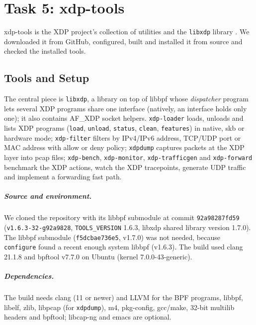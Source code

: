 \chapter{Task 5: xdp-tools}\label{ch:task5}

xdp-tools is the XDP project's collection of utilities and the \texttt{libxdp} library \autocite{xdptools_github}. We downloaded it from GitHub, configured, built and installed it from source and checked the installed tools.

\section{Tools and Setup}\label{sec:t5-setup}

The central piece is \texttt{libxdp}, a library on top of libbpf whose \emph{dispatcher} program lets several XDP programs share one interface (natively, an interface holds only one); it also contains AF\_XDP socket helpers. \texttt{xdp-loader} loads, unloads and lists XDP programs (\texttt{load}, \texttt{unload}, \texttt{status}, \texttt{clean}, \texttt{features}) in native, skb or hardware mode; \texttt{xdp-filter} filters by IPv4/IPv6 address, TCP/UDP port or MAC address with allow or deny policy; \texttt{xdpdump} captures packets at the XDP layer into pcap files; \texttt{xdp-bench}, \texttt{xdp-monitor}, \texttt{xdp-trafficgen} and \texttt{xdp-forward} benchmark the XDP actions, watch the XDP tracepoints, generate UDP traffic and implement a forwarding fast path.

\paragraph{Source and environment.} We cloned the repository with its libbpf submodule at commit \texttt{92a98287fd59} (\texttt{v1.6.3-32-g92a9828}, \texttt{TOOLS\_VERSION} 1.6.3, libxdp shared library version 1.7.0). The libbpf submodule (\texttt{f5dcbae736e5}, v1.7.0) was not needed, because \texttt{configure} found a recent enough system libbpf (v1.6.3). The build used clang 21.1.8 and bpftool v7.7.0 on Ubuntu (kernel 7.0.0-43-generic).

\paragraph{Dependencies.} The build needs clang (11 or newer) and LLVM for the BPF programs, libbpf, libelf, zlib, libpcap (for \texttt{xdpdump}), m4, pkg-config, gcc/make, 32-bit multilib headers and bpftool; libcap-ng and emacs are optional.



